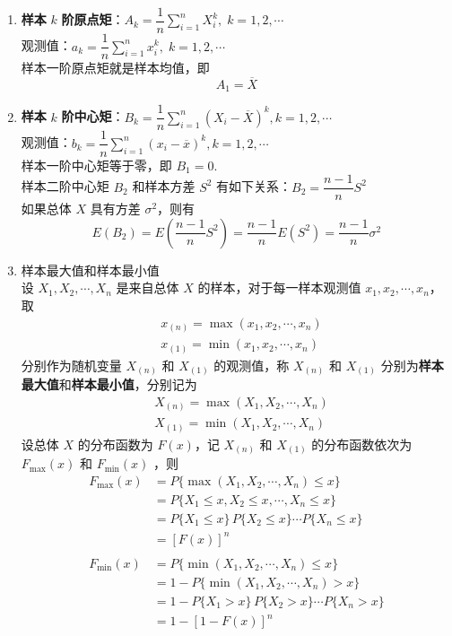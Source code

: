 \begin{enumerate}
    \item \textbf{样本} $k$ \textbf{阶原点矩}：$A_k = \dfrac{1}{n} \displaystyle\sum_{i=1}^n X_i^k, \; k=1,2,\cdots$ \\[0.5em]
    观测值：$a_k = \dfrac{1}{n} \displaystyle\sum_{i=1}^n x_i^k, \; k=1,2,\cdots$ \\[0.5em]
    样本一阶原点矩就是样本均值，即
    $$
    A_1 = \overline{X}
    $$

    \item \textbf{样本} $k$ \textbf{阶中心矩}：$B_k = \dfrac{1}{n} \displaystyle\sum_{i=1}^n (X_i - \overline{X})^k, k=1,2,\cdots$ \\[0.5em]
    观测值：$b_k = \dfrac{1}{n} \displaystyle\sum_{i=1}^n (x_i - \overline{x})^k, k=1,2,\cdots$ \\[0.5em]
    样本一阶中心矩等于零，即 $B_1 = 0$. \\
    样本二阶中心矩 $B_2$ 和样本方差 $S^2$ 有如下关系：$B_2 = \dfrac{n-1}{n} S^2$\\
    如果总体 $X$ 具有方差 $\sigma^2$，则有
    $$
    E(B_2) = E(\dfrac{n-1}{n} S^2) = \dfrac{n-1}{n} E(S^2) = \dfrac{n-1}{n} \sigma^2
    $$

    \item 样本最大值和样本最小值 \\
    设 $X_1, X_2, \cdots, X_n$ 是来自总体 $X$ 的样本，对于每一样本观测值 $x_1, x_2, \cdots, x_n$，取
    $$
    \begin{aligned}
        & x_{(n)} = \max(x_1, x_2, \cdots, x_n) \\
        & x_{(1)} = \min(x_1, x_2, \cdots, x_n)
    \end{aligned}
    $$
    分别作为随机变量 $X_{(n)}$ 和 $X_{(1)}$ 的观测值，称 $X_{(n)}$ 和 $X_{(1)}$ 分别为\textbf{样本最大值}和\textbf{样本最小值}，分别记为
    $$
    \begin{aligned}
        & X_{(n)} = \max(X_1, X_2, \cdots, X_n) \\
        & X_{(1)} = \min(X_1, X_2, \cdots, X_n)
    \end{aligned}
    $$
    设总体 $X$ 的分布函数为 $F(x)$，记 $X_{(n)}$ 和 $X_{(1)}$ 的分布函数依次为 $F_{\text{max}}(x)$ 和 $F_{\text{min}}(x)$ ，则
    $$
    \begin{aligned}
        F_{\text{max}}(x) &= P \{ \max(X_1, X_2, \cdots, X_n) \leqslant x \} \\
        &= P \{ X_1 \leqslant x, X_2 \leqslant x, \cdots, X_n \leqslant x \} \\
        &= P \{ X_1 \leqslant x \} \, P \{ X_2 \leqslant x \} \cdots P \{ X_n \leqslant x \} \\
        &= [F(x)]^n \\
        \\
        F_{\text{min}}(x) &= P \{ \min(X_1, X_2, \cdots, X_n) \leqslant x \} \\
        &= 1 - P \{ \min(X_1, X_2, \cdots, X_n) > x \} \\
        &= 1 - P \{ X_1 > x \} \, P \{ X_2 > x \} \cdots P \{ X_n > x \} \\
        &= 1-[1-F(x)]^n
    \end{aligned}
    $$
\end{enumerate}

